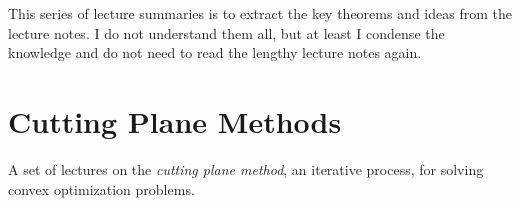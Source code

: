 \documentclass[12pt]{article}
\title{}
\begin{document}
\pagestyle{fancy}
\fancyhf{} %
\cfoot{\thepage}
\renewcommand{\headrulewidth}{1pt}

This series of lecture summaries is to extract the key theorems and ideas from the lecture notes. I do not understand them all, but at least I condense the knowledge and do not need to read the lengthy lecture notes again.

\section{Cutting Plane Methods}
A set of lectures on the \emph{cutting plane method}, an iterative process, for solving convex optimization problems.
\end{document}

